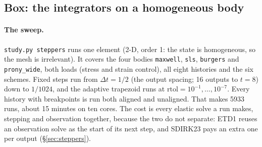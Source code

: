 \documentclass[11pt]{article}
\numberwithin{equation}{section}
\newcommand{\code}[1]{\texttt{#1}}
\begin{document}
\subsection{Box: the integrators on a homogeneous body}
\label{sec:box-steppers}

\paragraph{The sweep.}
\code{study.py steppers} runs one element (2-D, order 1: the state is
homogeneous, so the mesh is irrelevant). It covers the four bodies
\code{maxwell}, \code{sls}, \code{burgers} and \code{prony\_wide}, both
loads (stress and strain control), all eight histories and the six
schemes. Fixed steps run from $\Delta t=1/2$ (the output spacing; 16
outputs to $t=8$) down to $1/1024$, and the adaptive trapezoid runs at
$\text{rtol}=10^{-1},\dots,10^{-7}$. Every history with breakpoints is
run both aligned and unaligned. That makes 5933 runs, about 15 minutes on
ten cores. The cost is every elastic solve a run makes, stepping and
observation together, because the two do not separate: ETD1 reuses an
observation solve as the start of its next step, and SDIRK23 pays an
extra one per output (\S\ref{sec:steppers}).
\end{document}
